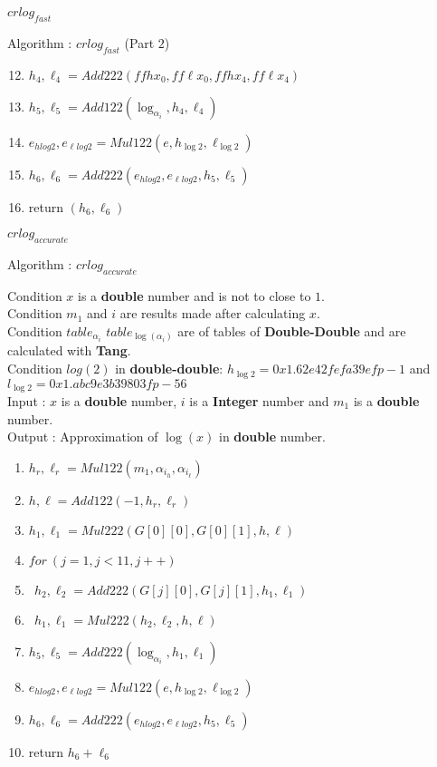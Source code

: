 \begin{frame}{$crlog_{fast}$}
  \tiny 
  \begin{algo}{Algorithm : \textbf{$crlog_{fast}$} (Part $2$)}\\
 \begin{enumerate}
\setcounter{enumi}{11}
\item$h_4,\ell_4 = Add222(ffhx_0,ff\ell x_0, ffhx_4,ff\ell x_4)$\\
\item $h_5,\ell_5 = Add122(\log_{\alpha_i}, h_4, \ell_4)$\\
\item $e_{hlog2},e_{\ell log2} = Mul122(e, h_{\log2}, \ell_{\log2})$\\
\item $h_6, \ell_6 = Add222(e_{hlog2}, e_{\ell log2},h_5,\ell_5)$\\
 \item return  $(h_6, \ell_6)$
\end{enumerate}
\end{algo}
\end{frame}

\begin{frame}{$crlog_{accurate}$}
   \tiny 
  \begin{algo}{Algorithm : \textbf{$crlog_{accurate}$}}

Condition $x$ is a \textbf{double} number and is not to close to $1$.\\
Condition $m_1$ and $i$ are results made after calculating $x$.\\
Condition $table_{\alpha_{i}}$  $table_{\log(\alpha_{i})}$ are of tables of \textbf{Double-Double} and are calculated with \textbf{Tang}.\\
Condition $log(2)$ in \textbf{double-double}: $h_{\log2} = 0x1.62e42fefa39efp-1$ and $l_{\log2} = 0x1.abc9e3b39803fp-56$ \\
Input : $x$ is a \textbf{double} number, $i$ is a \textbf{Integer} number and $m_1$ is a \textbf{double} number.\\
Output : Approximation of $\log(x)$ in \textbf{double} number.
 \begin{enumerate}
\item $h_r,\ell_r = Mul122(m_1,\alpha_i_h, \alpha_i_{\ell} )$
\item $h,\ell = Add122(-1,h_r,\ell_r)$
\item $h_1, \ell_1 = Mul222(G[0][0], G[0][1],h,\ell)$
\item $for \ (j = 1, j<11,j++)$
\item $\ \ h_2,\ell_2 = Add222(G[j][0], G[j][1],h_1, \ell_1)$
\item $\ \  h_1, \ell_1 = Mul222(h_2,\ell_2,h,\ell)$ 
\item $h_5,\ell_5 = Add222(\log_{\alpha_i}, h_1, \ell_1)$
\item $e_{hlog2},e_{\ell log2} = Mul122(e, h_{\log2}, \ell_{\log2})$
\item $h_6, \ell_6 = Add222(e_{hlog2}, e_{\ell log2},h_5,\ell_5)$
\item return  $h_6 + \ell_6$
\end{enumerate}
\end{algo}
\end{frame}

